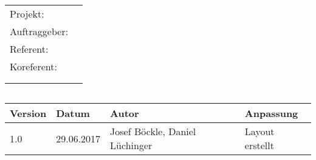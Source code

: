 \begin{titlepage}
\maketitle
\thispagestyle{empty} %

\begin{verbatim}












\end{verbatim}
\begin{center}
  \begin{tabular}[t]{ll}
	Projekt:       & \quad \projektName \\[1.2ex]
	Auftraggeber:  & \quad \auftraggeber\\[1.2ex]
	Referent: 	   & \quad \RefName\\ [1.2ex]
	Koreferent:    & \quad \coRefName\\\\\\ [1.2ex]
  \end{tabular}
\begin{verbatim}

\end{verbatim}
\begin{tabular}{|p{1.5 cm}|p{2.4 cm}|p{3 cm}| p{6 cm}|}
\hline
\textbf{Version} & \textbf{Datum} & \textbf{Autor} & \textbf{Anpassung} \\
\hline
\hline
1.0 & 29.06.2017 & Josef Böckle,  \newline Daniel Lüchinger & Layout erstellt\\ \hline
 \hline
\end{tabular}
\end{center}
\end{titlepage}
